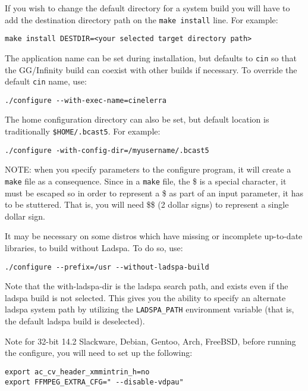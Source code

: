 If you wish to change the default directory for a system build you
will have to add the destination directory path on the \texttt{make
  install} line.  For example:
\begin{lstlisting}[style=sh]
make install DESTDIR=<your selected target directory path>
\end{lstlisting}

The application name can be set during installation, but defaults to
\texttt{cin} so that the GG/Infinity build can coexist with other
\CGG{} builds if necessary.  To override the default \texttt{cin}
name, use:
\begin{lstlisting}[style=sh]
./configure --with-exec-name=cinelerra
\end{lstlisting}

The home configuration directory can also be set, but default
location is traditionally \texttt{\$HOME/.bcast5}.  For example:

\begin{lstlisting}[style=sh]
./configure -with-config-dir=/myusername/.bcast5
\end{lstlisting}

NOTE: when you specify parameters to the configure program, it will
create a \texttt{make} file as a consequence.  Since in a
\texttt{make} file, the \$ is a special character, it must be
escaped so in order to represent a \$ as part of an input parameter,
it has to be stuttered.  That is, you will need \$\$ (2 dollar
signs) to represent a single dollar sign.

It may be necessary on some distros which have missing or incomplete
up-to-date libraries, to build \CGG{} without Ladspa.  To do so,
use:

\begin{lstlisting}[style=sh]
./configure --prefix=/usr --without-ladspa-build
\end{lstlisting}

Note that the with-ladspa-dir is the ladspa search path, and
exists even if the ladspa build is not selected.  This gives you
the ability to specify an alternate ladspa system path by
utilizing the \texttt{LADSPA\_PATH} environment variable (that is,
the default ladspa build is deselected).

Note for 32-bit 14.2 Slackware, Debian, Gentoo, Arch, FreeBSD,
before running the configure, you will need to set up the following:

\begin{lstlisting}[style=sh]
export ac_cv_header_xmmintrin_h=no
export FFMPEG_EXTRA_CFG=" --disable-vdpau"
\end{lstlisting}


